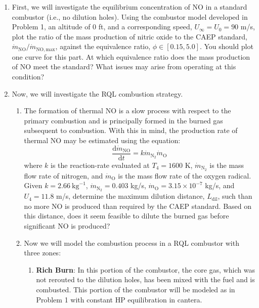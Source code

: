 \documentclass[11pt]{article}
\begin{document}
\begin{enumerate}[label=(\alph*)]
	\item First, we will investigate the equilibrium concentration of NO in a standard combustor (i.e., no dilution holes). Using the combustor model developed in Problem 1, an altitude of 0 ft, and a corresponding speed, $U_\infty = U_0 = 90$ m/s, plot the ratio of the mass production of nitric oxide to the CAEP standard, $\dot{m}_\mathrm{NO}/\dot{m}_\mathrm{NO,max}$, against the equivalence ratio, $\phi\in[0.15,5.0]$. You should plot one curve for this part. At which equivalence ratio does the mass production of NO meet the standard? What issues may arise from operating at this condition? 
    \item
    	Now, we will investigate the RQL combustion strategy.
        \begin{enumerate}[label=(\roman*)]
        	\item
            	The formation of thermal NO is a slow process with respect to the primary combustion and is principally formed in the burned gas subsequent to combustion. With this in mind, the production rate of thermal NO may be estimated using the equation:
                \begin{equation}
                	\frac{\mathrm{d} \dot{m}_\mathrm{NO}}{\mathrm{d}t} = k\dot{m}_{\mathrm{N_2}}\dot{m}_{\mathrm{O}}
                \end{equation}
                where $k$ is the reaction-rate evaluated at $T_4=1600$ K, $\dot{m}_{\mathrm{N_2}}$ is the mass flow rate of nitrogen, and $\dot{m}_{\mathrm{O}}$ is the mass flow rate of the oxygen radical. Given $k=2.66\ \mathrm{kg}^{-1}$, $\dot{m}_{\mathrm{N_2}}=0.403$ kg/s,  $\dot{m}_{\mathrm{O}}=3.15\times 10^{-7}$ kg/s, and $U_4=11.8$ m/s, determine the maximum dilution distance, $L_\mathrm{dil}$, such than no more NO is produced than required by the CAEP standard. Based on this distance, does it seem feasible to dilute the burned gas before significant NO is produced?
        	\item
            	Now we will model the combustion process in a RQL combustor with three zones:
                \begin{enumerate}[label=(\arabic*)]
                	\item 
                    	\textbf{Rich Burn}: In this portion of the combustor, the core gas, which was not rerouted to the dilution holes, has been mixed with the fuel and is combusted. This portion of the combustor will be modeled as in Problem 1 with constant HP equilibration in cantera.

\end{enumerate}
\end{enumerate}
\end{enumerate}
\end{document}
